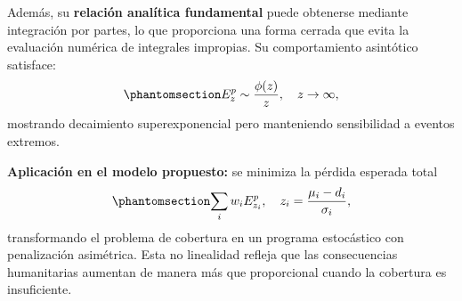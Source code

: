 \documentclass[
  spanish,
  us-letterpaper,
]{scrreprt}
\numberwithin{equation}{chapter} %
\begin{document}
Además, su \textbf{relación analítica fundamental} puede obtenerse
mediante integración por partes, lo que proporciona una forma cerrada
que evita la evaluación numérica de integrales impropias. Su
comportamiento asintótico satisface:
\begin{equation}\phantomsection\label{eq-PBHE_completa}{
E_z^p \sim \frac{\phi(z)}{z}, \quad z \to \infty,
}\end{equation} mostrando decaimiento superexponencial pero manteniendo
sensibilidad a eventos extremos.

\textbf{Aplicación en el modelo propuesto:} se minimiza la pérdida
esperada total \begin{equation}\phantomsection\label{eq-PBHE_completa}{
\sum_i w_i E_{z_i}^p, \quad z_i = \frac{\mu_i - d_i}{\sigma_i},
}\end{equation} transformando el problema de cobertura en un programa
estocástico con penalización asimétrica. Esta no linealidad refleja que
las consecuencias humanitarias aumentan de manera más que proporcional
cuando la cobertura es insuficiente.
\end{document}
